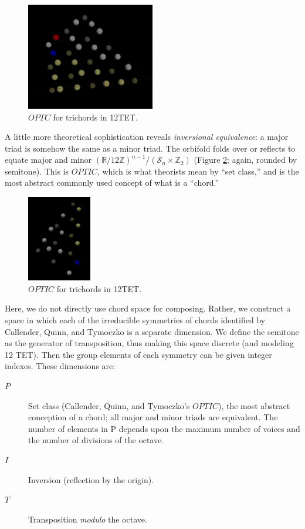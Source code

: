 \documentclass[english,11pt,letterpaper,onecolumn]{scrartcl}
\numberwithin{equation}{section}
\begin{document}
\begin{figure}
\centerline{\includegraphics[width = 0.5\textwidth]{opttc}}
\caption{\label{fig:opttc}
  $OPTC$ for trichords in 12TET.}
\end{figure}

A little more theoretical sophistication reveals \textit{inversional
equivalence}: a major triad is somehow the same as a minor triad. The orbifold
folds over or reflects to equate major and minor
$\left(\mathbb{R}/12\mathbb{Z}\right)^{n-1}/(\mathcal{S}_{n} \times
\mathbb{Z}_{2})$ (Figure \ref{fig:optic}; again, rounded by semitone). This is
$OPTIC$, which is what theorists mean by ``set class,'' and is the most abstract
commonly used concept of what is a ``chord.''

\begin{figure}
\centerline{\includegraphics[width = 0.25\textwidth]{opttic}}
\caption{\label{fig:optic}
$OPTIC$ for trichords in 12TET.}
\end{figure}

Here, we do not directly use chord space for composing. Rather, we construct a
space in which each of the irreducible symmetries of chords identified by
Callender, Quinn, and Tymoczko is a separate dimension. We define the semitone
as the generator of transposition, thus making this space discrete (and modeling
12 TET). Then the group elements of each symmetry can be given integer indexes.
These dimensions are:

\begin{description}
\item[$P$] Set class (Callender, Quinn, and Tymoczko's $OPTIC$), the
most abstract conception of a chord; all major and minor triads are equivalent.
The number of elements in P depends upon the maximum number of voices and the
number of divisions of the octave.
\item[$I$] Inversion (reflection by the origin).
\item[$T$] Transposition \emph{modulo} the octave.
\end{description}
\end{document}
